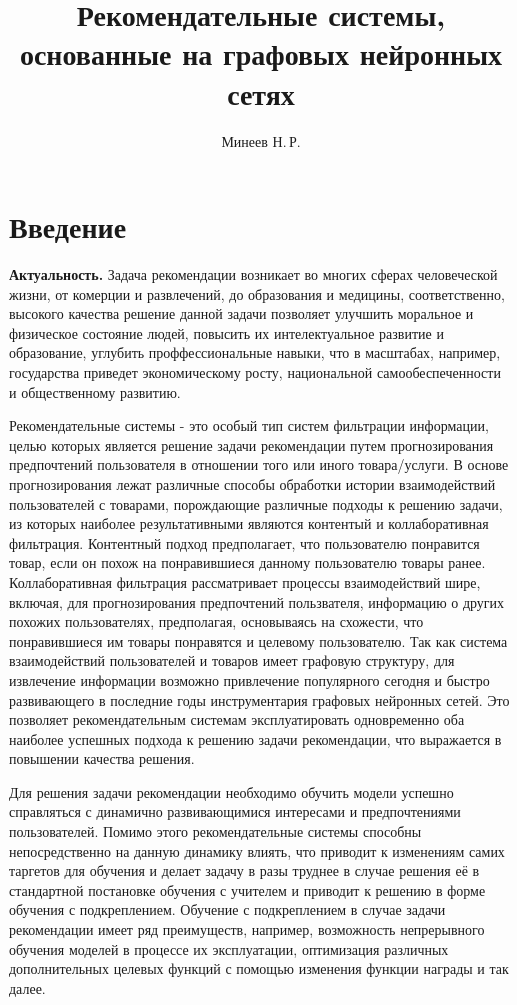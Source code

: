 \documentclass{mipt-thesis-ms}
\title{Рекомендательные системы, основанные на графовых нейронных сетях}
\author{Минеев Н.\,Р.}
\begin{document}
\frontmatter
\titlecontents

\mainmatter


\chapter{Введение}
{\bf Актуальность.} Задача рекомендации возникает во многих сферах человеческой жизни, от комерции и развлечений, до образования и медицины, соответственно, высокого качества решение данной задачи позволяет улучшить моральное и физическое состояние людей, повысить их интелектуальное развитие и образование, углубить проффессиональные навыки, что в масштабах, например, государства приведет экономическому росту, национальной самообеспеченности и общественному развитию.

Рекомендательные системы - это особый тип систем фильтрации информации, целью которых является решение задачи рекомендации путем прогнозирования предпочтений пользователя в отношении того или иного товара/услуги. В основе прогнозирования лежат различные способы обработки истории взаимодействий пользователей с товарами, порождающие различные подходы к решению задачи, из которых наиболее результативными являются контентый и коллаборативная фильтрация.  
Контентный подход предполагает, что пользователю понравится товар, если он похож на понравившиеся данному пользователю товары ранее. Коллаборативная фильтрация рассматривает процессы взаимодействий шире, включая, для прогнозирования предпочтений пользвателя, информацию о других похожих пользователях, предполагая, основываясь на схожести, что понравившиеся им товары понравятся и целевому пользователю. Так как система взаимодействий пользователей и товаров имеет графовую структуру, для извлечение информации возможно привлечение популярного сегодня и быстро развивающего в последние годы инструментария графовых нейронных сетей. Это позволяет рекомендательным системам эксплуатировать одновременно оба наиболее успешных подхода к решению задачи рекомендации, что выражается в повышении качества решения.

Для решения задачи рекомендации необходимо обучить модели успешно справляться с динамично развивающимися интересами и предпочтениями пользователей. Помимо этого рекомендательные системы способны непосредственно на данную динамику влиять, что приводит к изменениям самих таргетов для обучения и делает задачу в разы труднее в случае решения её в стандартной постановке обучения с учителем и приводит к решению в форме обучения с подкреплением. Обучение с подкреплением в случае задачи рекомендации имеет ряд преимуществ, например, возможность непрерывного обучения моделей в процессе их эксплуатации, оптимизация различных дополнительных целевых функций с помощью изменения функции награды и так далее.\\
\end{document}
